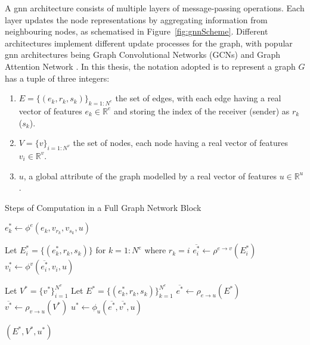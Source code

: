 A \gls{gnn} architecture consists of multiple layers of message-passing operations. Each layer updates the node representations by aggregating information from neighbouring nodes, as schematised in Figure~\ref{fig:gnnScheme}. Different architectures implement different update processes for the graph, with popular \gls{gnn} architectures being Graph Convolutional Networks (GCNs) \cite{gcnPaper} and Graph Attention Network \cite{velickovic2018graph}. In this thesis, the notation adopted is to represent a graph $G$ has a tuple of three integers:
\begin{enumerate}
    \item $E = \{(e_k, r_k, s_k)\}_{k=1:N^e}$ the set of edges, with each edge having a real vector of features $e_k \in \mathbb{R}^e$ and storing the index of the receiver (sender) as $r_k$ ($s_k$).
    \item $V = \{v\}_{i=1:N^v}$ the set of nodes, each node having a real vector of features $v_i \in \mathbb{R}^v$.
    \item $u$, a global attribute of the graph modelled by a real vector of features $u \in \mathbb{R}^u$. 
\end{enumerate}

\begin{algorithm}
    \caption{Steps of Computation in a Full Graph Network Block \cite{graphInductiveBias}}
    \label{algo:graph_network}
    \begin{algorithmic}[1]
            \State $e^*_k \gets \phi^e(e_k, v_{r_k}, v_{s_k}, u)$
        \EndFor

            \State Let $E_i^* = \{(e^*_k, r_k, s_k)\}$ for $k = 1 : N^e$ where $r_k = i$
            \State $\overline{e^*_i} \gets \rho^{e \to v}(E^*_i)$
            \State $v^*_i \gets \phi^v(\overline{e^*_i}, v_i, u)$
        \EndFor

        \State Let $V^* = \{v^*\}_{i=1}^{N^v}$
        \State Let $E^* = \{(e^*_k, r_k, s_k)\}_{k=1}^{N^e}$
        \State $\overline{e^*} \gets \rho_{e \to u}(E^*)$
        \State $\overline{v^*} \gets \rho_{v \to u}(V^*)$
        \State $u^* \gets \phi_u(\overline{e^*}, \overline{v^*}, u)$

        \State \Return $(E^*, V^*, u^*)$
    \EndFunction
    \end{algorithmic}
\end{algorithm}


